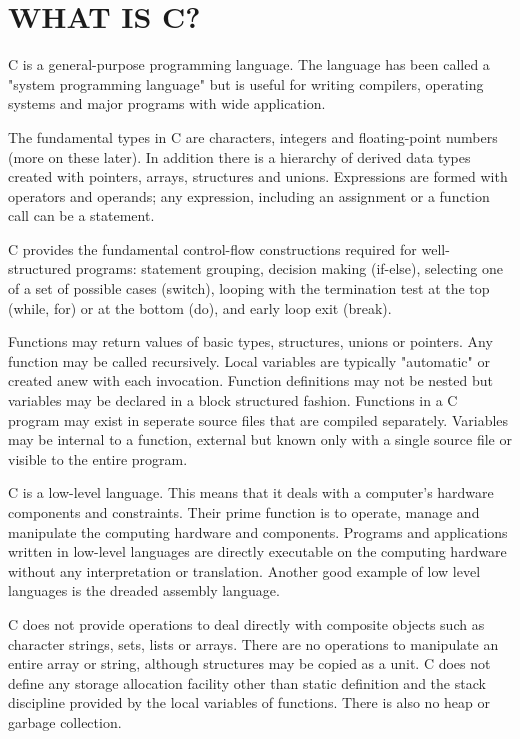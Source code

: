 \documentclass[a4paper]{article}
\begin{document}
\section{WHAT IS C?}
C is a general-purpose programming language. The language has been called a "system programming language" but is useful for writing compilers, operating systems and major programs with wide application. 
\par \vspace{0.25cm} 
The fundamental types in C are characters, integers and floating-point numbers (more on these later). In addition there is a hierarchy of derived data types created with pointers, arrays, structures and unions. Expressions are formed with operators and operands; any expression, including an assignment or a function call can be a statement.
\par \vspace{0.25cm}
C provides the fundamental control-flow constructions required for well-structured programs: statement grouping, decision making (if-else), selecting one of a set of possible cases (switch), looping with the termination test at the top (while, for) or at the bottom (do), and early loop exit (break).
\par \vspace{0.25cm}
Functions may return values of basic types, structures, unions or pointers. Any function may be called recursively. Local variables are typically "automatic" or created anew with each invocation. Function definitions may not be nested but variables may be declared in a block structured fashion. Functions in a C program may exist in seperate source files that are compiled separately. Variables may be internal to a function, external but known only with a single source file or visible to the entire program.
\par \vspace{0.25cm}
C is a low-level language. This means that it deals with a computer's hardware components and constraints. Their prime function is to operate, manage and manipulate the computing hardware and components. Programs and applications written in low-level languages are directly executable on the computing hardware without any interpretation or translation. Another good example of low level languages is the dreaded assembly language.
\par \vspace{0.25cm}
C does not provide operations to deal directly with composite objects such as character strings, sets, lists or arrays. There are no operations to manipulate an entire array or string, although structures may be copied as a unit. C does not define any storage allocation facility other than static definition and the stack discipline provided by the local variables of functions. There is also no heap or garbage collection. 
\end{document}
